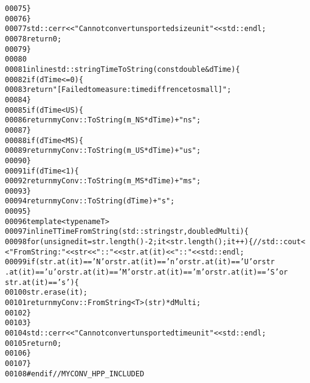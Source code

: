 \begin{footnotesize}
\begin{alltt}
00075                 \}
00076         \}
00077         std::cerr<<\textcolor{stringliteral}{"Cannot convert unsported size unit"}<<std::endl;
00078         \textcolor{keywordflow}{return} 0;
00079     \}
00080 
00081     \textcolor{keyword}{inline} std::string TimeToString(\textcolor{keyword}{const} \textcolor{keywordtype}{double} &dTime)\{
00082         \textcolor{keywordflow}{if} ( dTime <= 0)\{
00083             \textcolor{keywordflow}{return} \textcolor{stringliteral}{"[Failed to measure: time diffrence to small]"};
00084         \}
00085         \textcolor{keywordflow}{if} (dTime < US)\{
00086             \textcolor{keywordflow}{return} myConv::ToString(m\_NS * dTime)+\textcolor{stringliteral}{"ns"};
00087         \}
00088         \textcolor{keywordflow}{if}(dTime < MS)\{
00089             \textcolor{keywordflow}{return} myConv::ToString(m\_US * dTime)+\textcolor{stringliteral}{"us"};
00090         \}
00091         \textcolor{keywordflow}{if}(dTime < 1)\{
00092             \textcolor{keywordflow}{return} myConv::ToString(m\_MS * dTime)+\textcolor{stringliteral}{"ms"};
00093         \}
00094         \textcolor{keywordflow}{return} myConv::ToString(dTime)+\textcolor{stringliteral}{"s"};
00095     \}
00096     \textcolor{keyword}{template} <\textcolor{keyword}{typename} T>
00097     \textcolor{keyword}{inline} T TimeFromString(std::string str, \textcolor{keywordtype}{double} dMulti)\{
00098         \textcolor{keywordflow}{for} (\textcolor{keywordtype}{unsigned} it = str.length()-2; it < str.length(); it++)\{ \textcolor{comment}{//std::cout<
      <"FromString: "<<str<<"::"<<str.at(it)<<"::"<<std::endl;}
00099             \textcolor{keywordflow}{if}(str.at(it) == \textcolor{charliteral}{'N'} or str.at(it) == \textcolor{charliteral}{'n'} or str.at(it) == \textcolor{charliteral}{'U'} or str
      .at(it) == \textcolor{charliteral}{'u'} or str.at(it) == \textcolor{charliteral}{'M'} or str.at(it) == \textcolor{charliteral}{'m'} or str.at(it) == \textcolor{charliteral}{'S'} or 
      str.at(it) == \textcolor{charliteral}{'s'})\{
00100                     str.erase(it);
00101                     \textcolor{keywordflow}{return} myConv::FromString<T>(str) * dMulti;
00102             \}
00103         \}
00104         std::cerr<<\textcolor{stringliteral}{"Cannot convert unsported time unit"}<<std::endl;
00105         \textcolor{keywordflow}{return} 0;
00106     \}
00107 \}
00108 \textcolor{preprocessor}{#endif // MYCONV\_HPP\_INCLUDED}
\end{alltt}\end{footnotesize}
